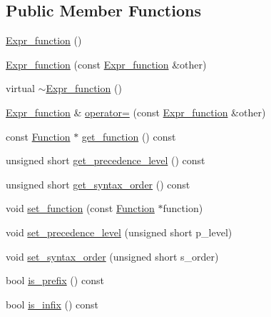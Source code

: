 \subsection*{Public Member Functions}
\begin{DoxyCompactItemize}
\item 
\hyperlink{classgenevalmag_1_1Expr__function_a11842df1439746a952704518f5e1df1e}{Expr\_\-function} ()
\item 
\hyperlink{classgenevalmag_1_1Expr__function_a2e4a1518e004d243a209e5c9ca0e54b4}{Expr\_\-function} (const \hyperlink{classgenevalmag_1_1Expr__function}{Expr\_\-function} \&other)
\item 
virtual \hyperlink{classgenevalmag_1_1Expr__function_ae7de6c473686005994a3444e6d953e52}{$\sim$Expr\_\-function} ()
\item 
\hyperlink{classgenevalmag_1_1Expr__function}{Expr\_\-function} \& \hyperlink{classgenevalmag_1_1Expr__function_aeac7341725e1953e65f251314fde4f54}{operator=} (const \hyperlink{classgenevalmag_1_1Expr__function}{Expr\_\-function} \&other)
\item 
const \hyperlink{classgenevalmag_1_1Function}{Function} $\ast$ \hyperlink{classgenevalmag_1_1Expr__function_a7f1fedb3efc2c8eaf07877a8e72a2579}{get\_\-function} () const 
\item 
unsigned short \hyperlink{classgenevalmag_1_1Expr__function_a25e611b881f5e74cd37d968c128a4f1b}{get\_\-precedence\_\-level} () const 
\item 
unsigned short \hyperlink{classgenevalmag_1_1Expr__function_af80357473c344ff776ec298d4424cbc0}{get\_\-syntax\_\-order} () const 
\item 
void \hyperlink{classgenevalmag_1_1Expr__function_a9d3e5b95868a98b9014d0f1de4ac8ae8}{set\_\-function} (const \hyperlink{classgenevalmag_1_1Function}{Function} $\ast$function)
\item 
void \hyperlink{classgenevalmag_1_1Expr__function_a9ad92c765b202584cc0d5b4648b2e44b}{set\_\-precedence\_\-level} (unsigned short p\_\-level)
\item 
void \hyperlink{classgenevalmag_1_1Expr__function_a4d7c89c116c5f5f081f3527aa76b5e97}{set\_\-syntax\_\-order} (unsigned short s\_\-order)
\item 
bool \hyperlink{classgenevalmag_1_1Expr__function_a0534ddcde21e3bd35fe12e85f6d8251f}{is\_\-prefix} () const 
\item 
bool \hyperlink{classgenevalmag_1_1Expr__function_af5a16ffe850f268df142c625205961dc}{is\_\-infix} () const 
\item 

\end{DoxyCompactItemize}
